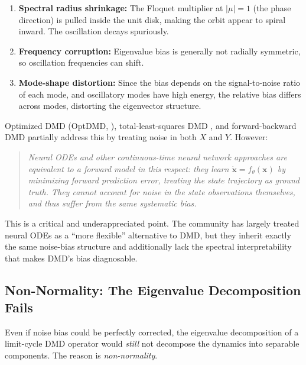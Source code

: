 \documentclass[12pt]{article}
\newcommand{\abs}[1]{\lvert #1 \rvert}
\begin{document}
\begin{enumerate}[label=(\roman*)]
  \item \textbf{Spectral radius shrinkage:} The Floquet multiplier at
  $\abs{\mu} = 1$ (the phase direction) is pulled inside the unit disk,
  making the orbit appear to spiral inward. The oscillation decays
  spuriously.
  \item \textbf{Frequency corruption:} Eigenvalue bias is generally not
  radially symmetric, so oscillation frequencies can shift.
  \item \textbf{Mode-shape distortion:} Since the bias depends on the
  signal-to-noise ratio of each mode, and oscillatory modes have high
  energy, the relative bias differs across modes, distorting the
  eigenvector structure.
\end{enumerate}

Optimized DMD (OptDMD, \citealt{askham2018variable}),
total-least-squares DMD \citep{hemati2017biasing}, and forward-backward
DMD \citep{dawson2016characterizing} partially address this by treating
noise in both $X$ and $Y$. However:

\begin{quote}
  \emph{Neural ODEs \citep{chen2018neural} and other continuous-time
  neural network approaches are equivalent to a forward model in this
  respect: they learn $\dot{\bm{x}} = f_\theta(\bm{x})$ by minimizing
  forward prediction error, treating the state trajectory as ground truth.
  They cannot account for noise in the state observations themselves, and
  thus suffer from the same systematic bias.}
\end{quote}

This is a critical and underappreciated point. The community has largely
treated neural ODEs as a ``more flexible'' alternative to DMD, but they
inherit exactly the same noise-bias structure and additionally lack the
spectral interpretability that makes DMD's bias diagnosable.

\subsection{Non-Normality: The Eigenvalue Decomposition Fails}
\label{sec:nonnormality_theory}

Even if noise bias could be perfectly corrected, the eigenvalue decomposition
of a limit-cycle DMD operator would \emph{still} not decompose the dynamics
into separable components. The reason is \emph{non-normality}.
\end{document}
